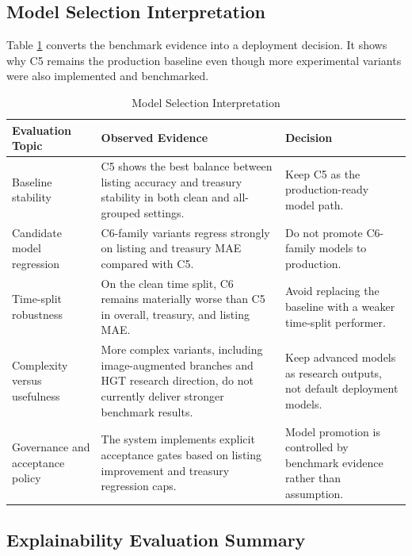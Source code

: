 \subsection{Model Selection Interpretation}

Table \ref{tab:chapter7-model-selection-interpretation} converts the benchmark evidence into a deployment decision. It shows why C5 remains the production baseline even though more experimental variants were also implemented and benchmarked.

\begin{table}[htbp]
    \centering
    \small
    \renewcommand{\arraystretch}{1.25}
    \begin{tabularx}{\textwidth}{>{\raggedright\arraybackslash}p{}>{\raggedright\arraybackslash}X>{\raggedright\arraybackslash}p{}}
        \toprule
        \rowcolor[gray]{0.9} \textbf{Evaluation Topic} & \textbf{Observed Evidence} & \textbf{Decision} \\
        \midrule
        Baseline stability & C5 shows the best balance between listing accuracy and treasury stability in both clean and all-grouped settings. & Keep C5 as the production-ready model path. \\
        Candidate model regression & C6-family variants regress strongly on listing and treasury MAE compared with C5. & Do not promote C6-family models to production. \\
        Time-split robustness & On the clean time split, C6 remains materially worse than C5 in overall, treasury, and listing MAE. & Avoid replacing the baseline with a weaker time-split performer. \\
        Complexity versus usefulness & More complex variants, including image-augmented branches and HGT research direction, do not currently deliver stronger benchmark results. & Keep advanced models as research outputs, not default deployment models. \\
        Governance and acceptance policy & The system implements explicit acceptance gates based on listing improvement and treasury regression caps. & Model promotion is controlled by benchmark evidence rather than assumption. \\
        \bottomrule
    \end{tabularx}
    \caption{Model Selection Interpretation}
    \label{tab:chapter7-model-selection-interpretation}
\end{table}

\subsection{Explainability Evaluation Summary}

